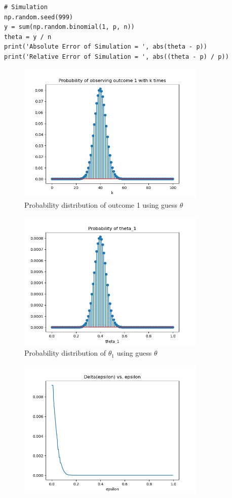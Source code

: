 \documentclass[preprint,12pt]{elsarticle}
\begin{document}
\begin{enumerate}
\begin{lstlisting}
# Simulation
np.random.seed(999)
y = sum(np.random.binomial(1, p, n))
theta = y / n
print('Absolute Error of Simulation = ', abs(theta - p))
print('Relative Error of Simulation = ', abs((theta - p) / p))
    \end{lstlisting}
    \begin{figure}[h]
        \center
        \includegraphics[width=0.8\textwidth]{7.png}
        \caption{Probability distribution of outcome 1 using guess $\theta$}
        \label{fig:5}
    \end{figure}
    \begin{figure}[h]
        \center
        \includegraphics[width=0.8\textwidth]{8.png}
        \caption{Probability distribution of $\theta_1$ using guess $\theta$}
        \label{fig:6}
    \end{figure}
    \begin{figure}[h]
        \center
        \includegraphics[width=0.8\textwidth]{9.png}

\end{figure}
\end{enumerate}
\end{document}
